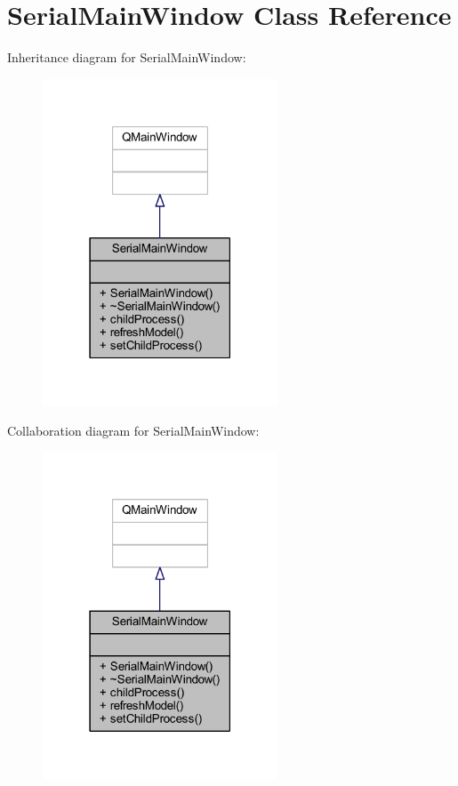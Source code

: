 \hypertarget{class_serial_main_window}{}\section{Serial\+Main\+Window Class Reference}
\label{class_serial_main_window}


Inheritance diagram for Serial\+Main\+Window\+:\nopagebreak
\begin{figure}[H]
\begin{center}
\leavevmode
\includegraphics[width=198pt]{d3/dc0/class_serial_main_window__inherit__graph}
\end{center}
\end{figure}


Collaboration diagram for Serial\+Main\+Window\+:\nopagebreak
\begin{figure}[H]
\begin{center}
\leavevmode
\includegraphics[width=198pt]{d0/dc6/class_serial_main_window__coll__graph}
\end{center}
\end{figure}
